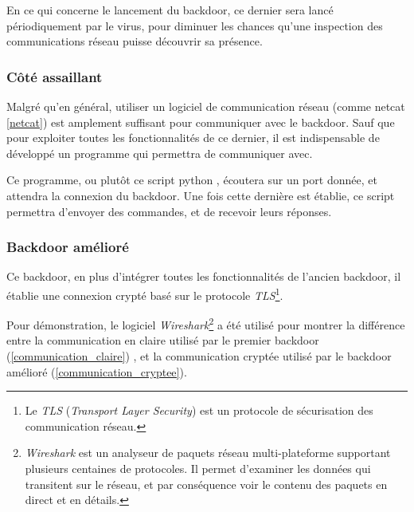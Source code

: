         En ce qui concerne le lancement du backdoor, ce dernier sera lancé périodiquement par le virus, pour 
        diminuer les chances qu'une inspection des communications réseau puisse découvrir sa présence.

        \subsubsection{Côté assaillant}
        Malgré qu'en général, utiliser un logiciel de communication réseau (comme netcat \autoref{netcat}) 
        est amplement suffisant pour communiquer avec 
        le backdoor. Sauf que pour exploiter toutes les fonctionnalités de ce dernier, il est indispensable 
        de développé un programme qui permettra de communiquer avec. 

        Ce programme, ou plutôt ce script python \cite{python}, écoutera sur un port donnée, et attendra la connexion du backdoor.
        Une fois cette dernière est établie, ce script permettra d'envoyer des commandes, et de recevoir leurs réponses.

        \subsubsection{Backdoor amélioré}

        Ce backdoor, en plus d'intégrer toutes les fonctionnalités de l'ancien backdoor, il établie une connexion 
        crypté basé sur le protocole \emph{TLS}\footnote{Le \emph{TLS} (\emph{Transport Layer Security})
        est un protocole de sécurisation des communication réseau.}.

        Pour démonstration, le logiciel \emph{Wireshark}\footnote{\emph{Wireshark} est un analyseur de 
        paquets réseau multi-plateforme supportant plusieurs centaines de protocoles. Il permet d’examiner les 
        données qui transitent sur le réseau, et par conséquence voir le contenu des paquets en direct et en détails.} 
        a été utilisé pour montrer la différence entre la communication 
        en claire utilisé par le premier backdoor (\autoref{communication_claire})
        , et la communication cryptée utilisé par le backdoor amélioré (\autoref{communication_cryptee}).

